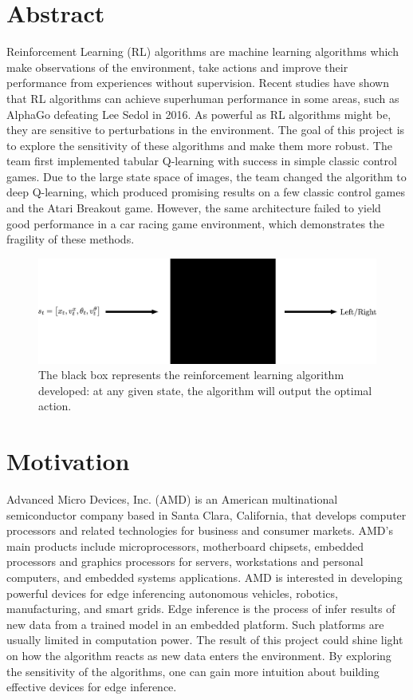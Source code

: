 \documentclass[12pt,letterpaper]{article}
\begin{document}
\section{Abstract}
Reinforcement Learning (RL) algorithms are machine learning algorithms which make observations of the environment, take actions and improve their performance from experiences without supervision. Recent studies have shown that RL algorithms can achieve superhuman performance in some areas, such as AlphaGo defeating Lee Sedol in 2016. As powerful as RL algorithms might be, they are sensitive to perturbations in the environment. The goal of this project is to explore the sensitivity of these algorithms and make them more robust. The team first implemented tabular Q-learning with success in simple classic control games. Due to the large state space of images, the team changed the algorithm to deep Q-learning, which produced promising results on a few classic control games and the Atari Breakout game. However, the same architecture failed to yield good performance in a car racing game environment, which demonstrates the fragility of these methods.

\begin{figure}[h!]
\centering\includegraphics[scale=0.2,clip]{learning_black_box_small.png}
\caption{The black box represents the reinforcement learning algorithm developed: at any given state, the algorithm will output the optimal action.}
\label{fig:black_box}
\end{figure}

\section{Motivation}
Advanced Micro Devices, Inc. (AMD) is an American multinational semiconductor company based in Santa Clara, California, that develops computer processors and related technologies for business and consumer markets. AMD's main products include microprocessors, motherboard chipsets, embedded processors and graphics processors for servers, workstations and personal computers, and embedded systems applications. AMD is interested in developing powerful devices for edge inferencing autonomous vehicles, robotics, manufacturing, and smart grids. Edge inference is the process of infer results of new data from a trained model in an embedded platform. Such platforms are usually limited in computation power. The result of this project could shine light on how the algorithm reacts as new data enters the environment. By exploring the sensitivity of the algorithms, one can gain more intuition about building effective devices for edge inference. \\
\end{document}
